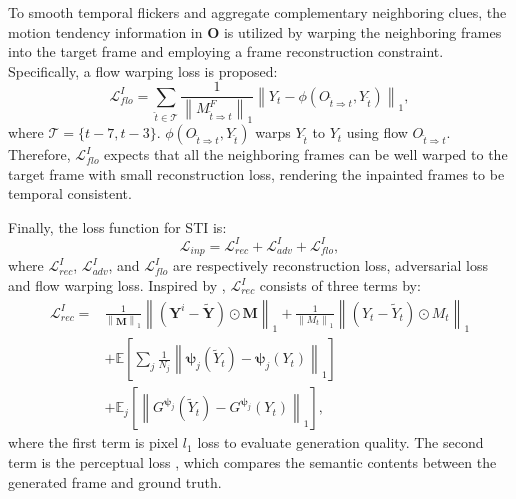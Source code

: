 To smooth temporal flickers and aggregate complementary neighboring clues, the motion tendency information in $\boldsymbol{O}$ is utilized by warping the neighboring frames into the target frame and employing a frame reconstruction constraint.
Specifically, a flow warping loss is proposed:
\begin{equation}
\label{eq:inp_flow}
\mathcal{L}^I_{flo}=\sum_{\widehat{t}\in\mathcal{T}}\frac{1}{\left\|M^F_{\widehat{t}\Rightarrow t}\right\|_1}\left\| Y_t-\phi(O_{\widehat{t}\Rightarrow t},Y_{\widehat{t}}) \right\|_1,
\end{equation}
where $\mathcal{T}=\{t-7,t-3\}$. $\phi(O_{\widehat{t}\Rightarrow t},Y_{\widehat{t}})$ warps $Y_{\widehat{t}}$ to $Y_{t}$ using flow $O_{\widehat{t}\Rightarrow t}$.
Therefore, $\mathcal{L}^I_{flo}$ expects that all the neighboring frames can be well warped to the target frame with small reconstruction loss, rendering the inpainted frames to be temporal consistent.



Finally, the loss function for STI is:
\begin{equation}
\label{eq:inpain_all}
\mathcal{L}_{inp}=\mathcal{L}^{I}_{rec}+\mathcal{L}^I_{adv}+\mathcal{L}^I_{flo},
\end{equation}
where $\mathcal{L}^{I}_{rec}$, $\mathcal{L}^I_{adv}$, and $\mathcal{L}^I_{flo}$ are respectively reconstruction loss, adversarial loss and flow warping loss.
Inspired by \cite{}, $\mathcal{L}^{I}_{rec}$ consists of three terms by:
\begin{equation}
\begin{aligned}
\mathcal{L}^{I}_{rec}=&\frac{1}{\left\|\boldsymbol{M} \right\|_1}\left\|(\boldsymbol{Y}^i-\widetilde{\boldsymbol{Y}})\odot \boldsymbol{M}\right\|_1 +\frac{1}{\left\|M_t \right\|_1}\left\|(Y_t-\widetilde{Y}_t)\odot M_t\right\|_1\\
&+\mathbb{E}[\sum_{j}\frac{1}{N_j}\left\|\boldsymbol{\psi}_j(\widetilde{Y}_t)-\boldsymbol{\psi}_j(Y_t)\right\|_1]\\
&+\mathbb{E}_j[\left\|G^{\boldsymbol{\psi}_j}(\widetilde{Y}_t)-G^{\boldsymbol{\psi}_j}(Y_t)\right\|_1],
\end{aligned}
\end{equation}
where the first term is pixel $l_1$ loss to evaluate generation quality. 
The second term is the perceptual loss \cite{gatys2015neural}, which compares the semantic contents between the generated frame and ground truth.

